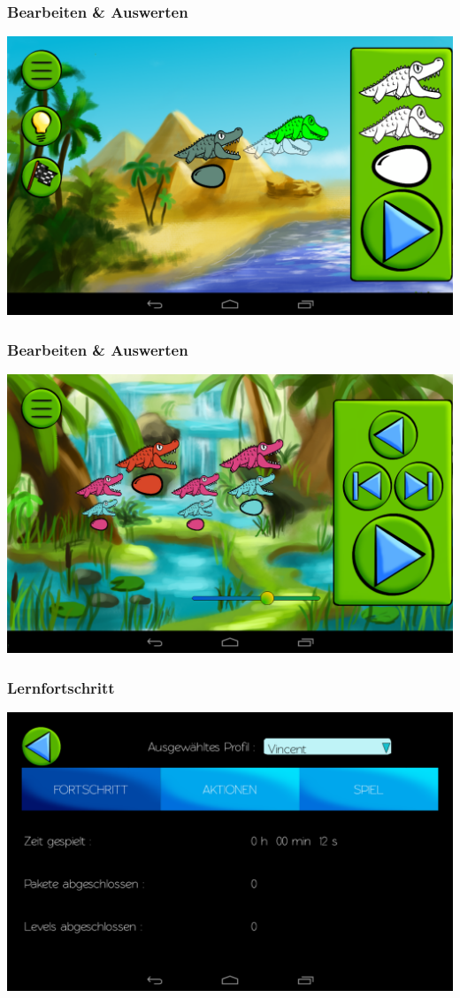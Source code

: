 \documentclass[t]{beamer}
\begin{document}
\begin{frame}
	\frametitle{Bearbeiten \& Auswerten}
	\includegraphics[width=\textwidth]{images/screenshots/term_edit}
\end{frame}

\begin{frame}
	\frametitle{Bearbeiten \& Auswerten}
	\includegraphics[width=\textwidth]{images/screenshots/simulation}
\end{frame}

\begin{frame}
	\frametitle{Lernfortschritt}
	\includegraphics[width=\textwidth]{images/screenshots/progress}
\end{frame}
\end{document}
